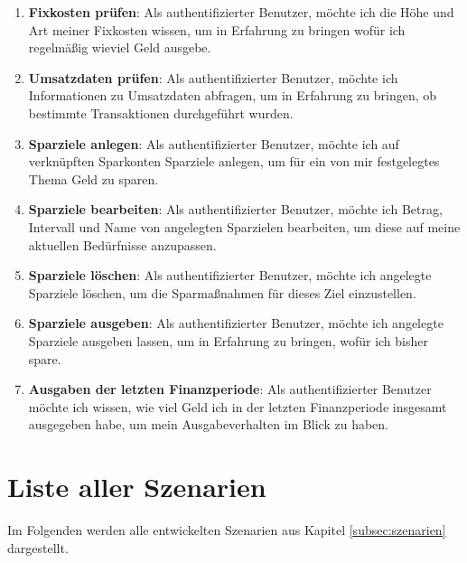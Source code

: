 \begin{enumerate}
\item\textbf{Fixkosten prüfen}: Als authentifizierter Benutzer, möchte ich die Höhe und Art meiner Fixkosten wissen, um in Erfahrung zu bringen wofür ich regelmäßig wieviel Geld ausgebe.

\item\textbf{Umsatzdaten prüfen}: Als authentifizierter Benutzer, möchte ich Informationen zu Umsatzdaten abfragen, um in Erfahrung zu bringen, ob bestimmte Transaktionen durchgeführt wurden.

\item\textbf{Sparziele anlegen}: Als authentifizierter Benutzer, möchte ich auf verknüpften Sparkonten Sparziele anlegen, um für ein von mir festgelegtes Thema Geld zu sparen.

\item\textbf{Sparziele bearbeiten}: Als authentifizierter Benutzer, möchte ich Betrag, Intervall und Name von angelegten Sparzielen bearbeiten, um diese auf meine aktuellen Bedürfnisse anzupassen.

\item\textbf{Sparziele löschen}: Als authentifizierter Benutzer, möchte ich angelegte Sparziele löschen, um die Sparmaßnahmen für dieses Ziel einzustellen.

\item\textbf{Sparziele ausgeben}: Als authentifizierter Benutzer, möchte ich angelegte Sparziele ausgeben lassen, um in Erfahrung zu bringen, wofür ich bisher spare.

\item\textbf{Ausgaben der letzten Finanzperiode}: Als authentifizierter Benutzer möchte ich wissen, wie viel Geld ich in der letzten Finanzperiode insgesamt ausgegeben habe, um mein Ausgabeverhalten im Blick zu haben.
\end{enumerate}

\section{Liste aller Szenarien}
\label{sec:anhang-szenarien}
Im Folgenden werden alle entwickelten Szenarien aus Kapitel \ref{subsec:szenarien} dargestellt. 

